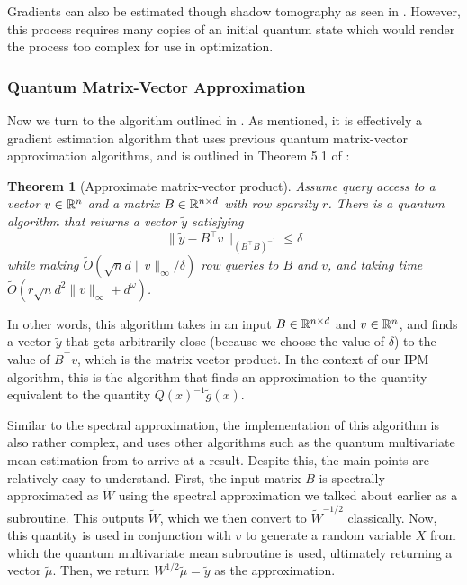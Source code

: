 \documentclass[11pt]{article}
\newtheorem{theorem}{Theorem}
\begin{document}
Gradients can also be estimated though shadow tomography as seen in \cite{abbasQuantumBackpropagationInformation2023}. However, this process requires many copies of an initial quantum state which would render the process too complex for use in optimization.

\subsubsection{Quantum Matrix-Vector Approximation} 
\label{matrix-vector}

Now we turn to the algorithm outlined in \cite{apersQuantumSpeedupsLinear2024}. As mentioned, it is effectively 
a gradient estimation algorithm that uses previous quantum matrix-vector approximation algorithms, and is outlined in Theorem 5.1 of \cite{apersQuantumSpeedupsLinear2024}:

\begin{theorem}[Approximate matrix-vector product]
	Assume query access to a vector \( v \in \mathbb R^{n} \) and a matrix \( B \in \mathbb R^{n \times d} \) with 
	row sparsity \( r \). There is a quantum algorithm that returns a vector \( \tilde y \) satisfying 
	\[
		\|\tilde y - B^{\top} v\|_{(B^{\top} B)^{-1}} \le  \delta
	\] 
	while making \( \widetilde O(\sqrt{n} d \|v\|_{\infty} / \delta) \) row queries to \( B \) and \( v \), and 
	taking time \( \widetilde O(r \sqrt{n} d^2 \|v\|_{\infty} + d^{\omega}) \).
\end{theorem}
In other words, this algorithm takes in an input \( B\in \mathbb R^{n \times d} \)	and \( v \in \mathbb R^{n} \), and 
finds a vector \( \tilde y \) that gets arbitrarily close (because we 
choose the value of \( \delta \)) to the value of \( B^{\top} v \), which is the matrix vector product. In the 
context of our IPM algorithm, this is the algorithm that finds an approximation to the quantity equivalent 
to the quantity \( Q(x)^{-1}\tilde g(x) \). 

Similar to the spectral approximation, the implementation of this algorithm is also rather complex, and uses 
other algorithms such as the quantum multivariate mean estimation from 
\cite{cornelissenNearOptimalQuantumAlgorithms2022} to arrive at a result. Despite this, the main points 
are relatively easy to understand. First, the input matrix \( B \) is spectrally approximated as \( \tilde W \) 
using the spectral approximation we talked about earlier as a subroutine. This outputs \( \tilde W \), which we then 
convert to \( \tilde W^{ - 1 / 2} \) classically. Now, this quantity is used in conjunction with \( v \) to 
generate a random variable \( X \) from which the quantum multivariate mean subroutine is used, ultimately 
returning a vector \( \tilde \mu \). Then, we return \( W^{ 1 / 2} \tilde \mu = \tilde y\) as the approximation. 
\end{document}
